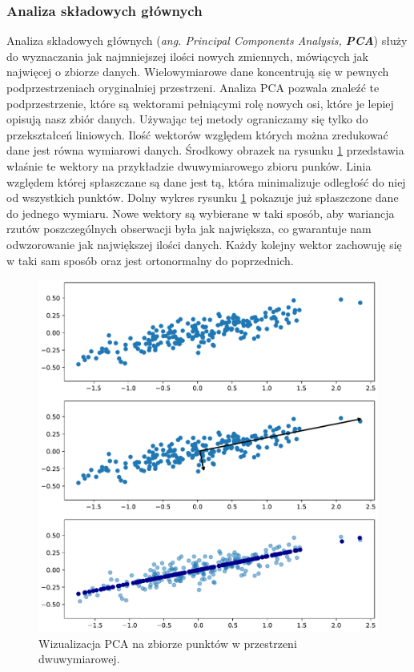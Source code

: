 \documentclass[a4paper,12pt]{book} %
\begin{document}
\subsubsection{Analiza składowych głównych}
Analiza składowych głównych (\textit{ang. Principal Components Analysis, \textbf{PCA}}) służy do wyznaczania jak najmniejszej ilości nowych zmiennych, mówiących jak najwięcej o zbiorze danych. Wielowymiarowe dane koncentrują się w pewnych podprzestrzeniach oryginalniej przestrzeni. Analiza PCA pozwala znaleźć te podprzestrzenie, które są wektorami pełniącymi rolę nowych osi, które je lepiej opisują nasz zbiór danych.\cite{redukcjawymiarow} Używając tej metody ograniczamy się tylko do przekształceń liniowych. Ilość wektorów względem których można zredukować dane jest równa wymiarowi danych. Środkowy obrazek na rysunku \ref{fig:pca} przedstawia właśnie te wektory na przykładzie dwuwymiarowego zbioru punków. Linia względem której spłaszczane są dane jest tą, która minimalizuje odległość do niej od wszystkich punktów. Dolny wykres rysunku \ref{fig:pca} pokazuje już spłaszczone dane do jednego wymiaru. Nowe wektory są wybierane w taki sposób, aby wariancja rzutów poszczególnych obserwacji była jak największa, co gwarantuje nam odwzorowanie jak największej ilości danych. Każdy kolejny wektor zachowuję się w taki sam sposób oraz jest ortonormalny do poprzednich.
\begin{figure}[h!]
	\centering
	\includegraphics[width=\textwidth]{pca.pdf}
	\caption{Wizualizacja PCA na zbiorze punktów w przestrzeni dwuwymiarowej.}
	\label{fig:pca}
\end{figure}
\end{document}
